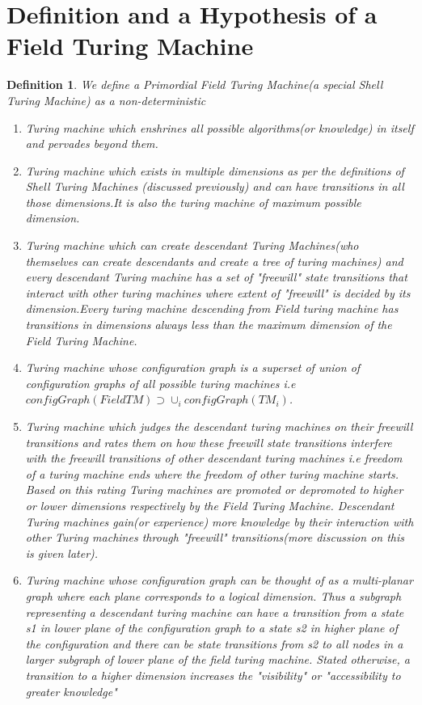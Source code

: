 \documentclass[11pt,onecolumn]{article}
\newtheorem{defn}{Definition}
\begin{document}
\section{Definition and a Hypothesis of a Field Turing Machine}
\begin{defn} We define a Primordial Field Turing Machine(a special Shell Turing Machine) as a non-deterministic
\begin{enumerate}
\item Turing machine which enshrines all possible algorithms(or knowledge) in itself and pervades beyond them. 
\item Turing machine which exists in multiple dimensions as per the definitions of  Shell Turing Machines (discussed previously) and can have transitions in all those dimensions.It is also the turing machine of maximum possible dimension.
\item Turing machine which can create descendant Turing Machines(who themselves can create descendants and create a tree of turing machines) and every descendant Turing machine has a set of "freewill" state transitions that interact with other turing machines where extent of "freewill" is decided by its dimension.Every turing machine descending from Field turing machine has transitions in dimensions always less than the maximum dimension of the Field Turing Machine. 
\item Turing machine whose configuration graph is a superset of union of configuration graphs of all possible turing machines i.e $configGraph(FieldTM) \supset \cup_{i} configGraph(TM_{i})$.
\item Turing machine which judges the descendant turing machines on their freewill transitions and rates them on how these freewill state transitions interfere with the freewill transitions of other descendant turing machines i.e freedom of a turing machine ends where the freedom of other turing machine starts. Based on this rating Turing machines are promoted or depromoted to higher or lower dimensions respectively by the Field Turing Machine. Descendant Turing machines gain(or experience) more knowledge by their interaction  with other Turing machines through "freewill" transitions(more discussion on this is given later).
\item Turing machine whose configuration graph can be thought of as a multi-planar graph where each plane corresponds to a logical dimension. Thus a subgraph representing a descendant turing machine can have a transition from a state s1 in lower plane of the configuration graph to a state s2 in higher plane of the configuration and there can be state transitions from s2 to all nodes in a larger subgraph of lower plane of the field turing machine. Stated otherwise, a transition to a higher dimension increases the "visibility" or "accessibility to greater knowledge"
\end{enumerate}
\end{defn}
\end{document}
